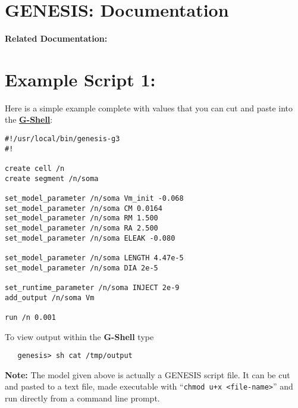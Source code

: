 \documentclass[12pt]{article}
\begin{document}
\section*{GENESIS: Documentation}

{\bf Related Documentation:}

\section*{Example Script 1:}

Here is a simple example complete with values that you can cut and paste into the \href{../gshell/gshell.tex}{\bf G-Shell}:

\begin{verbatim}
#!/usr/local/bin/genesis-g3
#!

create cell /n
create segment /n/soma

set_model_parameter /n/soma Vm_init -0.068
set_model_parameter /n/soma CM 0.0164
set_model_parameter /n/soma RM 1.500
set_model_parameter /n/soma RA 2.500
set_model_parameter /n/soma ELEAK -0.080

set_model_parameter /n/soma LENGTH 4.47e-5
set_model_parameter /n/soma DIA 2e-5

set_runtime_parameter /n/soma INJECT 2e-9
add_output /n/soma Vm

run /n 0.001
\end{verbatim}
To view output within the {\bf G-Shell} type
\begin{verbatim}
   genesis> sh cat /tmp/output
\end{verbatim}
{\bf Note:} The model given above is actually a GENESIS script file. It can be cut and pasted to a text file, made executable with ``{\tt chmod u+x <file-name>}'' and run directly from a command line prompt.
\end{document}
